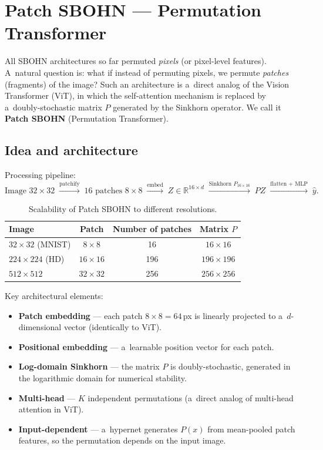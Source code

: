\documentclass[11pt,a4paper]{report}
\begin{document}
\section{Patch SBOHN --- Permutation Transformer}\label{sec:patch_sbohn}

All SBOHN architectures so far permuted \emph{pixels} (or pixel-level features).
A~natural question is: what if instead of permuting pixels, we permute \emph{patches}
(fragments) of the image? Such an architecture is a~direct analog of the Vision Transformer (ViT),
in which the self-attention mechanism is replaced by a~doubly-stochastic matrix $P$
generated by the Sinkhorn operator. We call it \textbf{Patch SBOHN} (Permutation Transformer).

\subsection{Idea and architecture}

Processing pipeline:
\[
\text{Image } 32{\times}32
\;\xrightarrow{\text{patchify}}\;
16 \text{ patches } 8{\times}8
\;\xrightarrow{\text{embed}}\;
Z \in \mathbb{R}^{16 \times d}
\;\xrightarrow{\text{Sinkhorn } P_{16 \times 16}}\;
PZ
\;\xrightarrow{\text{flatten + MLP}}\;
\hat{y}.
\]

\begin{table}[h]
\centering
\caption{Scalability of Patch SBOHN to different resolutions.}
\begin{tabular}{lccc}
\hline
\textbf{Image} & \textbf{Patch} & \textbf{Number of patches} & \textbf{Matrix $P$} \\
\hline
$32{\times}32$ (MNIST) & $8{\times}8$ & 16 & $16{\times}16$ \\
$224{\times}224$ (HD) & $16{\times}16$ & 196 & $196{\times}196$ \\
$512{\times}512$ & $32{\times}32$ & 256 & $256{\times}256$ \\
\hline
\end{tabular}
\end{table}

Key architectural elements:
\begin{itemize}
\item \textbf{Patch embedding} --- each patch $8{\times}8 = 64$\,px is linearly projected to a~$d$-dimensional vector (identically to ViT).
\item \textbf{Positional embedding} --- a~learnable position vector for each patch.
\item \textbf{Log-domain Sinkhorn} --- the matrix $P$ is doubly-stochastic, generated in the logarithmic domain for numerical stability.
\item \textbf{Multi-head} --- $K$ independent permutations (a~direct analog of multi-head attention in ViT).
\item \textbf{Input-dependent} --- a~hypernet generates $P(x)$ from mean-pooled patch features, so the permutation depends on the input image.
\end{itemize}
\end{document}
